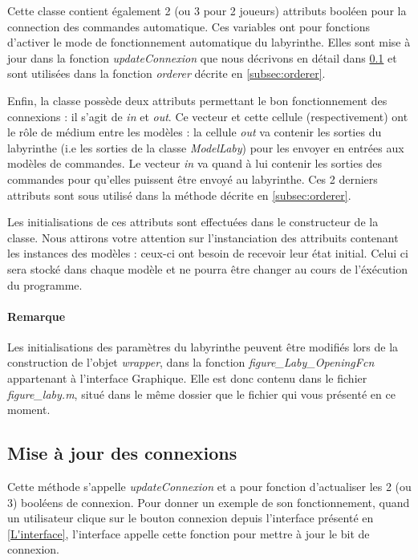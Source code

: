 Cette classe contient également 2 (ou 3 pour 2 joueurs) attributs booléen pour la connection des commandes automatique. Ces variables ont pour fonctions d'activer le mode de fonctionnement automatique du labyrinthe. Elles sont mise à jour dans la fonction \emph{updateConnexion} que nous décrivons en détail dans \ref{subsec:majConnexion} et sont utilisées dans la fonction \emph{orderer} décrite en \ref{subsec:orderer}. 


Enfin, la classe possède deux attributs permettant le bon fonctionnement des connexions : il s'agit de \emph{in} et \emph{out}. Ce vecteur et cette cellule (respectivement) ont le rôle de médium entre les modèles : la cellule \emph{out} va contenir les sorties du labyrinthe (i.e les sorties de la classe \emph{ModelLaby}) pour les envoyer en entrées aux modèles de commandes. Le vecteur \emph{in} va quand à lui contenir les sorties des commandes pour qu'elles puissent être envoyé au labyrinthe. Ces 2 derniers attributs sont sous utilisé dans la méthode décrite en \ref{subsec:orderer}. 


Les initialisations de ces attributs sont effectuées dans le constructeur de la classe. Nous attirons votre attention sur l'instanciation des attribuits contenant les instances des modèles : ceux-ci ont besoin de recevoir leur état initial. Celui ci sera stocké dans chaque modèle et ne pourra être changer au cours de l'éxécution du programme.  

\paragraph*{Remarque} Les initialisations des paramètres du labyrinthe peuvent être modifiés lors de la construction de l'objet \emph{wrapper}, dans la fonction \emph{figure\_Laby\_OpeningFcn} appartenant à l'interface Graphique. Elle est donc contenu dans le fichier \emph{figure\_laby.m}, situé dans le même dossier que le fichier qui vous présenté en ce moment.
\subsection{Mise à jour des connexions}\label{subsec:majConnexion}
Cette méthode s'appelle \emph{updateConnexion} et a pour fonction d'actualiser les 2 (ou 3) booléens de connexion. Pour donner un exemple de son fonctionnement, quand un utilisateur clique sur le bouton connexion depuis l'interface présenté en \ref{L'interface}, l'interface appelle cette fonction pour mettre à jour le bit de connexion. 

